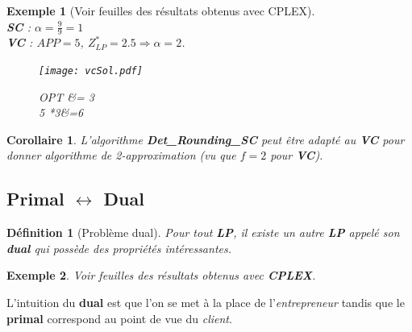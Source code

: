\documentclass[12pt]{article}
\newcommand{\titre}[1]{\textcolor{title}{#1}}
\newtheorem{de}{D\'efinition}[section]
\newtheorem{exemple}{Exemple}[section]
\newtheorem{corollaire}{Corollaire}[section]
\begin{document}
\begin{exemple}[Voir feuilles des résultats obtenus avec CPLEX]$ $\\
\textbf{\titre{SC}} : $\alpha = \frac{9}{9} = 1$ \\
\textbf{\titre{VC}} : $APP = 5$, $Z^*_{LP} = 2.5 \Rightarrow \alpha = 2$. \\
\begin{figure}[H]
	\begin{minipage}{0.5\linewidth}
		\centering
		\texttt{[image: vcSol.pdf]}
	\end{minipage}
	\begin{minipage}{0.5\linewidth}
		\centering
		\begin{flalign*}
		OPT &= 3\\
		5 *3&=6
		\end{flalign*}
	\end{minipage}
\end{figure}
\end{exemple}

\begin{corollaire}
L'algorithme \textbf{Det\_Rounding\_SC} peut être adapté au \textbf{\titre{VC}}
pour donner algorithme de 2-approximation (vu que $f = 2$ pour
\textbf{\titre{VC}}).
\end{corollaire}

\subsection{Primal $\leftrightarrow$ Dual}

\begin{de}[Problème dual]
Pour tout \textbf{\titre{LP}}, il existe un autre \textbf{\titre{LP}} appelé son
\textbf{dual} qui possède des propriétés intéressantes.
\end{de}

\begin{exemple}
Voir feuilles des résultats obtenus avec \textbf{CPLEX}.
\end{exemple}

L'intuition du \textbf{dual} est que l'on se met à la place de
l'\textit{entrepreneur} tandis que le \textbf{primal} correspond au point de vue
du \textit{client}. \\
\end{document}
